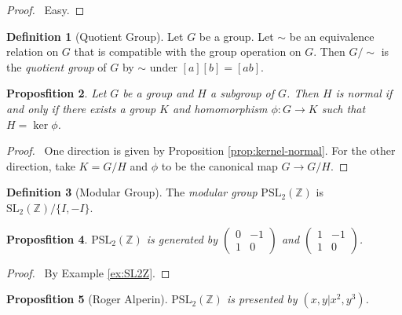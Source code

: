 \documentclass{book}
\let\qed\relax
\newtheorem{prop}{Proposfition}[chapter]
\theoremstyle{definition}
\newtheorem{df}[prop]{Definition}
\begin{document}
\begin{proof}
\pf\ Easy. \qed
\end{proof}

\begin{df}[Quotient Group]
Let $G$ be a group. Let $\sim$ be an equivalence relation on $G$ that is compatible with the group operation on $G$. Then $G/\sim$ is the \emph{quotient group} of $G$ by $\sim$ under $[a][b] = [ab]$.
\end{df}

\begin{prop}
Let $G$ be a group and $H$ a subgroup of $G$. Then $H$ is normal if and only if there exists a group $K$ and homomorphism $\phi : G \rightarrow K$ such that $H = \ker \phi$.
\end{prop}

\begin{proof}
\pf\ One direction is given by Proposition \ref{prop:kernel-normal}. For the other direction, take $K = G / H$ and $\phi$ to be the canonical map $G \rightarrow G / H$. \qed
\end{proof}

\begin{df}[Modular Group]
The \emph{modular group} $\mathrm{PSL}_2(\mathbb{Z})$ is $\mathrm{SL}_2(\mathbb{Z}) / \{ I, -I \}$.
\end{df}

\begin{prop}
$\mathrm{PSL}_2(\mathbb{Z})$ is generated by $\left( \begin{array}{cc} 0 & -1 \\ 1 & 0 \end{array} \right)$ and $\left( \begin{array}{cc} 1 & -1 \\ 1 & 0 \end{array} \right)$.
\end{prop}

\begin{proof}
\pf\ By Example \ref{ex:SL2Z}. 
\end{proof}

\begin{prop}[Roger Alperin]
$\mathrm{PSL}_2(\mathbb{Z})$ is presented by $(x,y|x^2,y^3)$.
\end{prop}
\end{document}
